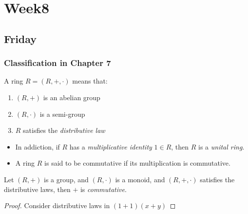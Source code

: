 \chapter{Week8}
\section{Friday}
\subsection{Classification in Chapter 7}
\begin{definition}
A ring $R=(R,+,\cdot)$ means that:
\begin{enumerate}
\item
$(R,+)$ is an abelian group
\item
$(R,\cdot)$ is a semi-group
\item
$R$ satisfies the \emph{distributive law}
\end{enumerate}
\begin{itemize}
\item
In addiction, if $R$ has a \emph{multiplicative identity} $1\in R$, then $R$ is a \emph{unital ring}.
\item
A ring $R$ is said to be commutative if its multiplication is commutative.
\end{itemize}
\end{definition}
\begin{proposition}
Let $(R,+)$ is a group, and $(R,\cdot)$ is a monoid, and $(R,+,\cdot)$ satisfies the distributive laws, then $+$ is \emph{commutative}.
\end{proposition}
\begin{proof}
Consider distributive laws in $(1+1)(x+y)$
\end{proof}

